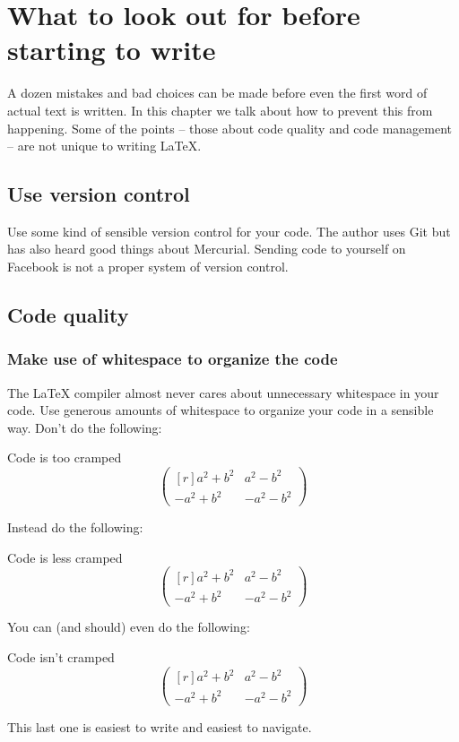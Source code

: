 \chapter{What to look out for before starting to write}

A dozen mistakes and bad choices can be made before even the first word of actual text is written.
In this chapter we talk about how to prevent this from happening.
Some of the points -- those about code quality and code management -- are not unique to writing {\LaTeX}.




\section{Use version control}

Use some kind of sensible version control for your code.
The author uses Git but has also heard good things about Mercurial.
Sending code to yourself on Facebook is not a proper system of version control.





\section{Code quality}



\subsection{Make use of whitespace to organize the code}

The {\LaTeX} compiler almost never cares about unnecessary whitespace in your code.
Use generous amounts of whitespace to organize your code in a sensible way.
Don’t do the following:
\begin{showcode}{Code is too cramped}
\[\begin{pmatrix*}[r]a^2+b^2&a^2-b^2\\-a^2+b^2&-a^2-b^2\end{pmatrix*}\]
\end{showcode}
Instead do the following:
\begin{showcode}{Code is less cramped}
\[
  \begin{pmatrix*}[r]
     a^2 + b^2 &  a^2 - b^2 \\
    -a^2 + b^2 & -a^2 - b^2
  \end{pmatrix*}
\]
\end{showcode}
You can (and should) even do the following:
\begin{showcode}{Code isn’t cramped}
\[
  \begin{pmatrix*}[r]
    a^2 + b^2
    &
    a^2 - b^2
    \\
    - a^2 + b^2
    &
    - a^2 - b^2
  \end{pmatrix*}
\]
\end{showcode}
This last one is easiest to write and easiest to navigate.

